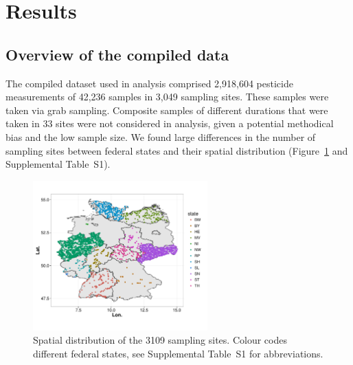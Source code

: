 \documentclass[journal=esthag,manuscript=article]{achemso}
\begin{document}
\section{Results}
\subsection{Overview of the compiled data}


The compiled dataset used in analysis comprised 2,918,604 pesticide measurements of 42,236 samples in 3,049 sampling sites.  %
These samples were taken via grab sampling.  %
Composite samples of different durations that were taken in 33 sites were not considered in analysis, given a potential methodical bias and the low sample size.
We found large differences in the number of sampling sites between federal states and their spatial distribution (Figure~\ref{fig:fig1} and Supplemental Table~S1).

\begin{figure}[ht]
  \includegraphics[width=0.6\textwidth]{figure1.pdf}
  \caption{Spatial distribution of the 3109 sampling sites. Colour codes different federal states, see Supplemental Table~S1 for abbreviations.}
  \label{fig:fig1}
\end{figure}
\end{document}
